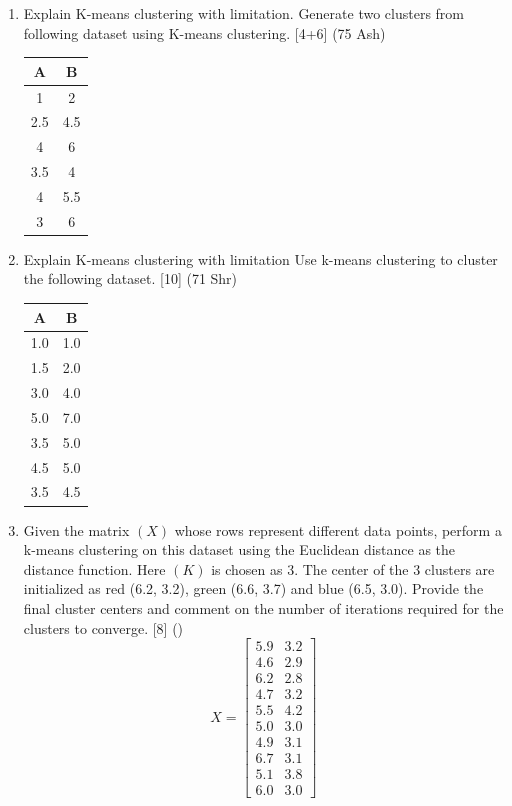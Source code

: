 \documentclass[12pt]{article}
\begin{document}
\begin{enumerate}[topsep=0pt, noitemsep]
      \item Explain K-means clustering with limitation. Generate two clusters from following dataset using K-means clustering. \hfill [4+6] (75 Ash)\\
        \small
        \begin{tabular}{|c|c|}
          \hline
          A & B \\ \hline
          1 & 2 \\ \hline
          2.5 & 4.5 \\ \hline
          4 & 6 \\ \hline
          3.5 & 4 \\ \hline
          4 & 5.5 \\ \hline
          3 & 6 \\ \hline
        \end{tabular}
        \normalsize

      \item Explain K-means clustering with limitation Use k-means clustering to cluster the following dataset. \hfill [10] (71 Shr)\\
        \small
        \begin{tabular}{|c|c|}
          \hline
          A & B \\ \hline
          1.0 & 1.0 \\ \hline
          1.5 & 2.0 \\ \hline
          3.0 & 4.0 \\ \hline
          5.0 & 7.0 \\ \hline
          3.5 & 5.0 \\ \hline
          4.5 & 5.0 \\ \hline
          3.5 & 4.5 \\ \hline
        \end{tabular}
        \normalsize

      \item Given the matrix $(X)$ whose rows represent different data points, perform a k-means clustering on this dataset using the Euclidean distance as the distance function. Here $(K)$ is chosen as 3. The center of the 3 clusters are initialized as red (6.2, 3.2), green (6.6, 3.7) and blue (6.5, 3.0). Provide the final cluster centers and comment on the number of iterations required for the clusters to converge. \hfill [8] ()
        \[ X = \begin{bmatrix}
          5.9 & 3.2 \\ 4.6 & 2.9 \\ 6.2 & 2.8 \\ 4.7 & 3.2 \\ 5.5 & 4.2 \\
          5.0 & 3.0 \\ 4.9 & 3.1 \\ 6.7 & 3.1 \\ 5.1 & 3.8 \\ 6.0 & 3.0
        \end{bmatrix} \]


\end{enumerate}
\end{document}
